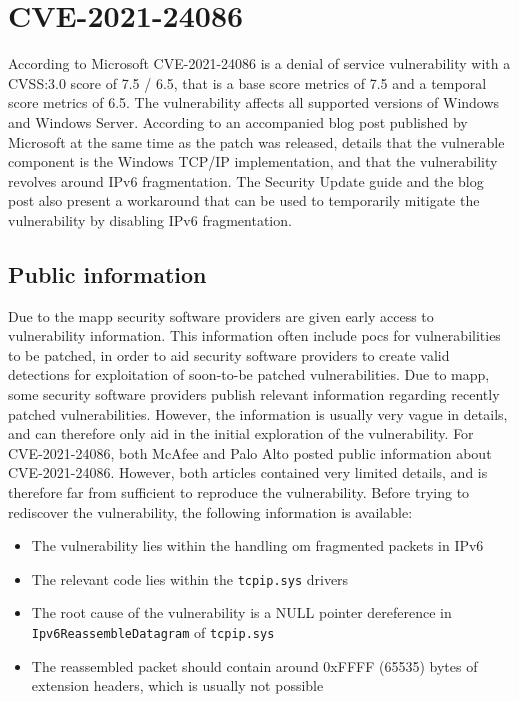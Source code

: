 \documentclass{report}
\begin{document}
\section{CVE-2021-24086}
\label{sec:CVE-2021-24086}
According to Microsoft\cite{url:microsoft:cve-2021-24086} CVE-2021-24086 is a denial of service vulnerability with a CVSS:3.0 score of 7.5 / 6.5, that is a base score metrics of 7.5 and a temporal score metrics of 6.5. The vulnerability affects all supported versions of Windows and Windows Server. According to an accompanied blog post published by Microsoft
\cite{url:microsoft:cve-2021-24086-blog} at the same time as the patch was released, details that the vulnerable component is the Windows TCP/IP implementation, and that the vulnerability revolves around IPv6 fragmentation. The Security Update guide and the blog post also present a workaround that can be used to temporarily mitigate the vulnerability by disabling IPv6 fragmentation.

\subsection{Public information}
\label{sec:CVE-2021-24086:public-information}
Due to the \gls{mapp}\cite{url:microsoft:mapp} security software providers are given early access to vulnerability information. This information often include \gls{poc}s for vulnerabilities to be patched, in order to aid security software providers to create valid detections for exploitation of soon-to-be patched vulnerabilities. Due to \gls{mapp}, some security software providers publish relevant information regarding recently patched vulnerabilities. However, the information is usually very vague in details, and can therefore only aid in the initial exploration of the vulnerability. For CVE-2021-24086, both McAfee\cite{url:mcafee:cve-2021-24086} and Palo Alto\cite{url:palo-alto:cve-2021-24086} posted public information about CVE-2021-24086. However, both articles contained very limited details, and is therefore far from sufficient to reproduce the vulnerability. Before trying to rediscover the vulnerability, the following information is available:

\begin{itemize}
    \item The vulnerability lies within the handling om fragmented packets in IPv6
    \item The relevant code lies within the \texttt{tcpip.sys} drivers
    \item The root cause of the vulnerability is a NULL pointer dereference in \texttt{Ipv6ReassembleDatagram} of \texttt{tcpip.sys}
    \item The reassembled packet should contain around 0xFFFF (65535) bytes of extension headers, which is usually not possible
\end{itemize}
 
\end{document}
